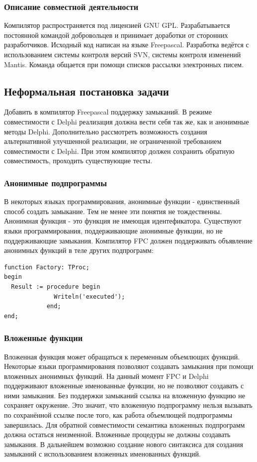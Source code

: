\documentclass{imcs}
\begin{document}
\subsubsection{Описание совместной деятельности}

Компилятор распространяется под лицензией GNU GPL. Разрабатывается
постоянной командой добровольцев и принимает доработки от сторонних разработчиков.
Исходный код написан на языке Freepascal. Разработка ведётся с использованием системы
контроля версий SVN, системы контроля изменений Mantis. Команда общается при
помощи списков рассылки электронных писем.

\subsection{Неформальная постановка задачи}

Добавить в компилятор Freepascal поддержку замыканий. В режиме совместимости с 
Delphi реализация должна вести себя так же, как и анонимные методы
Delphi. Дополнительно рассмотреть возможность создания альтернативной улучшенной
реализации, не ограниченной требованием совместимости с Delphi.
При этом компилятор должен сохранить обратную совместимость, проходить существующие тесты. 

\subsubsection{Анонимные подпрограммы}

В некоторых языках программирования, анонимные функции - единственный
способ создать замыкание. Тем не менее эти понятия не тождественны.
Анонимная функция - это функция не имеющая идентефикатора. Существуют
языки программирования, поддерживающие анонимные функции, но не
поддерживающие замыкания. Компилятор FPC должен поддерживать
объявление анонимных функций в теле других подпрограмм:
\begin{lstlisting}
function Factory: TProc;
begin
  Result := procedure begin
              Writeln('executed');
            end;
end;
\end{lstlisting}

\subsubsection{Вложенные функции}

Вложенная функция может обращаться к переменным объемлющих функций. Некоторые
языки программирования позволяют создавать замыкания при помощи вложенных анонимных
функций. На данный момент FPC и Delphi поддерживают вложенные именованные функции, но
не позволяют создавать с ними замыкания. Без поддержки замыканий ссылка на вложенную
функцию не сохраняет окружение. Это значит, что вложенную подпрограмму нельзя вызывать 
по сохранённой ссылке после того, как работа объемлющей подпрограммы завершилась.
Для обратной совместимости семантика вложенных подпрограмм должна остаться неизменной.
Вложенные процедуры не должны создавать замыкания. В дальнейшем возможно создание
нового синтаксиса для создания замыканий с использованием вложенных именованных функций.
\end{document}

